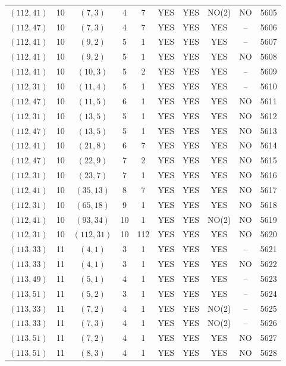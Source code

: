 \begin{longtable}{|c|c|c|c|c|c|c|c|c|c|}
$(112, 41)$ & 10 & $(7, 3)$ & 4 & 7 & YES & YES & NO(2) & NO & 5605\\
$(112, 47)$ & 10 & $(7, 3)$ & 4 & 7 & YES & YES & YES & -- & 5606\\
$(112, 41)$ & 10 & $(9, 2)$ & 5 & 1 & YES & YES & YES & -- & 5607\\
$(112, 41)$ & 10 & $(9, 2)$ & 5 & 1 & YES & YES & YES & NO & 5608\\
$(112, 41)$ & 10 & $(10, 3)$ & 5 & 2 & YES & YES & YES & -- & 5609\\
$(112, 31)$ & 10 & $(11, 4)$ & 5 & 1 & YES & YES & YES & -- & 5610\\
$(112, 47)$ & 10 & $(11, 5)$ & 6 & 1 & YES & YES & YES & NO & 5611\\
$(112, 31)$ & 10 & $(13, 5)$ & 5 & 1 & YES & YES & YES & NO & 5612\\
$(112, 47)$ & 10 & $(13, 5)$ & 5 & 1 & YES & YES & YES & NO & 5613\\
$(112, 41)$ & 10 & $(21, 8)$ & 6 & 7 & YES & YES & YES & NO & 5614\\
$(112, 47)$ & 10 & $(22, 9)$ & 7 & 2 & YES & YES & YES & NO & 5615\\
$(112, 31)$ & 10 & $(23, 7)$ & 7 & 1 & YES & YES & YES & NO & 5616\\
$(112, 41)$ & 10 & $(35, 13)$ & 8 & 7 & YES & YES & YES & NO & 5617\\
$(112, 31)$ & 10 & $(65, 18)$ & 9 & 1 & YES & YES & YES & NO & 5618\\
$(112, 41)$ & 10 & $(93, 34)$ & 10 & 1 & YES & YES & NO(2) & NO & 5619\\
$(112, 31)$ & 10 & $(112, 31)$ & 10 & 112 & YES & YES & YES & NO & 5620\\
$(113, 33)$ & 11 & $(4, 1)$ & 3 & 1 & YES & YES & YES & -- & 5621\\
$(113, 33)$ & 11 & $(4, 1)$ & 3 & 1 & YES & YES & YES & NO & 5622\\
$(113, 49)$ & 11 & $(5, 1)$ & 4 & 1 & YES & YES & YES & -- & 5623\\
$(113, 51)$ & 11 & $(5, 2)$ & 3 & 1 & YES & YES & YES & -- & 5624\\
$(113, 33)$ & 11 & $(7, 2)$ & 4 & 1 & YES & YES & NO(2) & -- & 5625\\
$(113, 33)$ & 11 & $(7, 3)$ & 4 & 1 & YES & YES & NO(2) & -- & 5626\\
$(113, 51)$ & 11 & $(7, 2)$ & 4 & 1 & YES & YES & YES & NO & 5627\\
$(113, 51)$ & 11 & $(8, 3)$ & 4 & 1 & YES & YES & YES & NO & 5628\\

\end{longtable}
